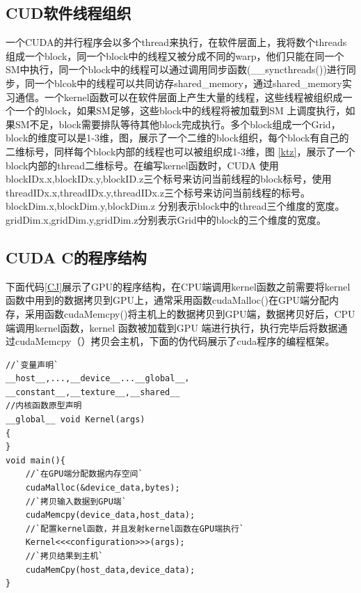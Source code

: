 \subsection{CUD软件线程组织}

一个CUDA的并行程序会以多个thread来执行，在软件层面上，我将数个threads组成一个block，同一个block中的线程又被分成不同的warp，他们只能在同一个SM中执行，同一个block中的线程可以通过调用同步函数(\_\_syncthreads())进行同步，同一个blcok中的线程可以共同访存shared\_memory，通过shared\_memory实习通信。一个kernel函数可以在软件层面上产生大量的线程，这些线程被组织成一个一个的block，如果SM足够，这些block中的线程将被加载到SM 上调度执行，如果SM不足，block需要排队等待其他block完成执行。多个block组成一个Grid，block的维度可以是1-3维，图，展示了一个二维的block组织，每个block有自己的二维标号，同样每个block内部的线程也可以被组织成1-3维，图 \ref{ktz}，展示了一个block内部的thread二维标号。在编写kernel函数时，CUDA 使用blockIDx.x,blockIDx.y,blockID.z三个标号来访问当前线程的block标号，使用threadIDx.x,threadIDx.y,threadIDx.z三个标号来访问当前线程的标号。blockDim.x,blockDim.y,blockDim.z 分别表示block中的thread三个维度的宽度。gridDim.x,gridDim.y,gridDim.z分别表示Grid中的block的三个维度的宽度。

\subsection{CUDA C的程序结构}

下面代码\ref{CJ}展示了GPU的程序结构，在CPU端调用kernel函数之前需要将kernel函数中用到的数据拷贝到GPU上，通常采用函数cudaMalloc()在GPU端分配内存，采用函数cudaMemcpy()将主机上的数据拷贝到GPU端，数据拷贝好后，CPU 端调用kernel函数，kernel 函数被加载到GPU 端进行执行，执行完毕后将数据通过cudaMemcpy（）拷贝会主机，下面的伪代码展示了cuda程序的编程框架。
\begin{lstlisting}[caption={CUDA程序结构},captionpos=b,firstnumber=1,label={CJ}]
//`变量声明`
__host__,...,__device__...__global__，
__constant__,__texture__,__shared__
//内核函数原型声明
__global__ void Kernel(args)
{
}
void main(){
    //`在GPU端分配数据内存空间`
    cudaMalloc(&device_data,bytes);
    //`拷贝输入数据到GPU端`
    cudaMemcpy(device_data,host_data);
    //`配置kernel函数，并且发射kernel函数在GPU端执行`
    Kernel<<<configuration>>>(args);
    //`拷贝结果到主机`
    cudaMemCpy(host_data,device_data);
}
\end{lstlisting}
